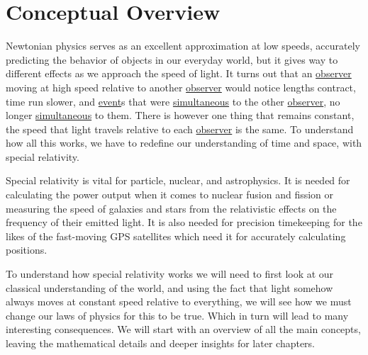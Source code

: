 \mainmatter
\chapter{Conceptual Overview}

Newtonian physics serves as an excellent approximation at low speeds, accurately predicting the behavior of objects in our everyday world, but it gives way to different effects as we approach the speed of light. It turns out that an \hyperlink{def-observer}{observer} moving at high speed relative to another \hyperlink{def-observer}{observer} would notice lengths contract, time run slower, and \hyperlink{def-event}{event}s that were \hyperlink{def-simultaneity}{simultaneous} to the other \hyperlink{def-observer}{observer}, no longer \hyperlink{def-simultaneity}{simultaneous} to them. There is however one thing that remains constant, the speed that light travels relative to each \hyperlink{def-observer}{observer} is the same. To understand how all this works, we have to redefine our understanding of time and space, with special relativity.

Special relativity is vital for particle, nuclear, and astrophysics. It is needed for calculating the power output when it comes to nuclear fusion and fission or measuring the speed of galaxies and stars from the relativistic effects on the frequency of their emitted light. It is also needed for precision timekeeping for the likes of the fast-moving GPS satellites which need it for accurately calculating positions.

To understand how special relativity works we will need to first look at our classical understanding of the world, and using the fact that light somehow always moves at constant speed relative to everything, we will see how we must change our laws of physics for this to be true. Which in turn will lead to many interesting consequences. We will start with an overview of all the main concepts, leaving the mathematical details and deeper insights for later chapters.


